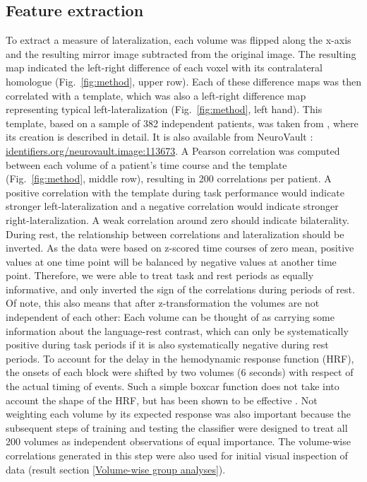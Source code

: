\documentclass[fleqn,10pt]{SelfArx} %
\begin{document}
\subsection{Feature extraction} \label{Feature extraction}
To extract a measure of lateralization, each volume was flipped along the x-axis and the resulting mirror image subtracted from the original image. The resulting map indicated the left-right difference of each voxel with its contralateral homologue (Fig.~\ref{fig:method}, upper row). Each of these difference maps was then correlated with a template, which was also a left-right difference map representing typical left-lateralization (Fig.~\ref{fig:method}, left hand). This template, based on a sample of 382 independent patients, was taken from \citet{Wegrzyn_2019}, where its creation is described in detail. It is also available from NeuroVault \citep{Gorgolewski_2015}: \href{https://identifiers.org/neurovault.image:113673}{identifiers.org/neurovault.image:113673}. A Pearson correlation was computed between each volume of a patient’s time course and the template (Fig.~\ref{fig:method}, middle row), resulting in 200 correlations per patient. A positive correlation with the template during task performance would indicate stronger left-lateralization and a negative correlation would indicate stronger right-lateralization. A weak correlation around zero should indicate bilaterality. During rest, the relationship between correlations and lateralization should be inverted. As the data were based on z-scored time courses of zero mean, positive values at one time point will be balanced by negative values at another time point. Therefore, we were able to treat task and rest periods as equally informative, and only inverted the sign of the correlations during periods of rest. Of note, this also means that after z-transformation the volumes are not independent of each other: Each volume can be thought of as carrying some information about the language-rest contrast, which can only be systematically positive during task periods if it is also systematically negative during rest periods. To account for the delay in the hemodynamic response function (HRF), the onsets of each block were shifted by two volumes (6 seconds) with respect of the actual timing of events. Such a simple boxcar function does not take into account the shape of the HRF, but has been shown to be effective \citep{Wegrzyn_2018}. Not weighting each volume by its expected response was also important because the subsequent steps of training and testing the classifier were designed to treat all 200 volumes as independent observations of equal importance. The volume-wise correlations generated in this step were also used for initial visual inspection of data (result section \ref{Volume-wise group analyses}).
\end{document}
